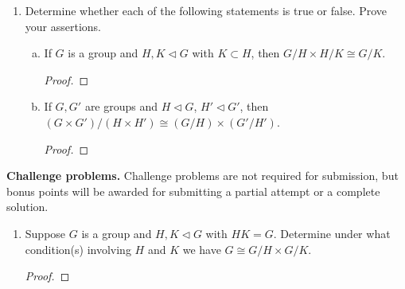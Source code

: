 \documentclass{article}
\theoremstyle{definition}
\numberwithin{equation}{section}
\renewcommand\>{\rangle}
\newcommand\<{\langle}
\newcommand\0{\mathbf{0}}
\newcommand\iso{\cong}
\begin{document}
\begin{enumerate}[(H1)]
\begin{enumerate}[(a)]
\begin{proof}

\end{proof}

\end{enumerate}

\item 
Determine whether each of the following statements is true or false.  Prove your assertions.  

\begin{enumerate}[(a)]

\item 
If $G$ is a group and $H, K \lhd G$ with $K \subset H$, then $G/H \times H/K \iso G/K$.  

\begin{proof}

\end{proof}


\item 
If $G, G'$ are groups and $H \lhd G$, $H' \lhd G'$, then $(G \times G') / (H \times H') \iso (G/H) \times (G'/H')$.  

\begin{proof}

\end{proof}

\end{enumerate}

\end{enumerate}


\bigskip
\noindent
\textbf{Challenge problems.}
Challenge problems are not required for submission, but bonus points will be awarded for submitting a partial attempt or a complete solution.  

\begin{enumerate}[(C1)]
\item 
Suppose $G$ is a group and $H, K \lhd G$ with $HK = G$.  Determine under what condition(s) involving $H$ and $K$ we have $G \iso G/H \times G/K$.  

\begin{proof}

\end{proof}

\end{enumerate}
\end{document}
